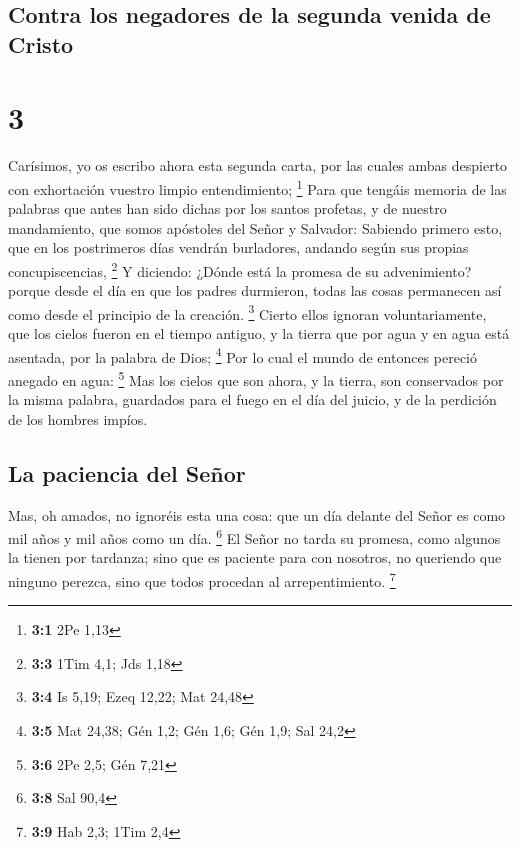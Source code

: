 \hypertarget{contra-los-negadores-de-la-segunda-venida-de-cristo}{%
\subsection{Contra los negadores de la segunda venida de
Cristo}\label{contra-los-negadores-de-la-segunda-venida-de-cristo}}

\hypertarget{section-2}{%
\section{3}\label{section-2}}

 Carísimos, yo os escribo ahora esta segunda carta, por las
cuales ambas despierto con exhortación vuestro limpio entendimiento;
\footnote{\textbf{3:1} 2Pe 1,13}  Para que tengáis memoria
de las palabras que antes han sido dichas por los santos profetas, y de
nuestro mandamiento, que somos apóstoles del Señor y Salvador:
 Sabiendo primero esto, que en los postrimeros días vendrán
burladores, andando según sus propias concupiscencias, \footnote{\textbf{3:3}
  1Tim 4,1; Jds 1,18}  Y diciendo: ¿Dónde está la promesa de
su advenimiento? porque desde el día en que los padres durmieron, todas
las cosas permanecen así como desde el principio de la creación.
\footnote{\textbf{3:4} Is 5,19; Ezeq 12,22; Mat 24,48} 
Cierto ellos ignoran voluntariamente, que los cielos fueron en el tiempo
antiguo, y la tierra que por agua y en agua está asentada, por la
palabra de Dios; \footnote{\textbf{3:5} Mat 24,38; Gén 1,2; Gén 1,6; Gén
  1,9; Sal 24,2}  Por lo cual el mundo de entonces pereció
anegado en agua: \footnote{\textbf{3:6} 2Pe 2,5; Gén 7,21} 
Mas los cielos que son ahora, y la tierra, son conservados por la misma
palabra, guardados para el fuego en el día del juicio, y de la perdición
de los hombres impíos.

\hypertarget{la-paciencia-del-seuxf1or}{%
\subsection{La paciencia del Señor}\label{la-paciencia-del-seuxf1or}}

 Mas, oh amados, no ignoréis esta una cosa: que un día
delante del Señor es como mil años y mil años como un día. \footnote{\textbf{3:8}
  Sal 90,4}  El Señor no tarda su promesa, como algunos la
tienen por tardanza; sino que es paciente para con nosotros, no
queriendo que ninguno perezca, sino que todos procedan al
arrepentimiento. \footnote{\textbf{3:9} Hab 2,3; 1Tim 2,4}

